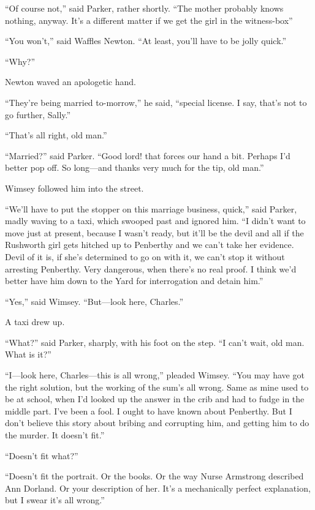 \enquote{Of course not,} said Parker, rather shortly. \enquote{The mother probably knows nothing, anyway. It's a different matter if we get the girl in the witness-box\longdash}

\enquote{You won't,} said Waffles Newton. \enquote{At least, you'll have to be jolly quick.}

\enquote{Why?}

Newton waved an apologetic hand.

\enquote{They're being married to-morrow,} he said, \enquote{special license. I say, that's not to go further, Sally.}

\enquote{That's all right, old man.}

\enquote{Married?} said Parker. \enquote{Good lord! that forces our hand a bit. Perhaps I'd better pop off. So long\allowbreak---\allowbreak and thanks very much for the tip, old man.}

Wimsey followed him into the street.

\enquote{We'll have to put the stopper on this marriage business, quick,} said Parker, madly waving to a taxi, which swooped past and ignored him. \enquote{I didn't want to move just at present, because I wasn't ready, but it'll be the devil and all if the Rushworth girl gets hitched up to Penberthy and we can't take her evidence. Devil of it is, if she's determined to go on with it, we can't stop it without arresting Penberthy. Very dangerous, when there's no real proof. I think we'd better have him down to the Yard for interrogation and detain him.}

\enquote{Yes,} said Wimsey. \enquote{But\allowbreak---\allowbreak look here, Charles.}

A taxi drew up.

\enquote{What?} said Parker, sharply, with his foot on the step. \enquote{I can't wait, old man. What is it?}

\enquote{I\allowbreak---\allowbreak look here, Charles\allowbreak---\allowbreak this is all wrong,} pleaded Wimsey. \enquote{You may have got the right solution, but the working of the sum's all wrong. Same as mine used to be at school, when I'd looked up the answer in the crib and had to fudge in the middle part. I've been a fool. I ought to have known about Penberthy. But I don't believe this story about bribing and corrupting him, and getting him to do the murder. It doesn't fit.}

\enquote{Doesn't fit what?}

\enquote{Doesn't fit the portrait. Or the books. Or the way Nurse Armstrong described Ann Dorland. Or your description of her. It's a mechanically perfect explanation, but I swear it's all wrong.}

